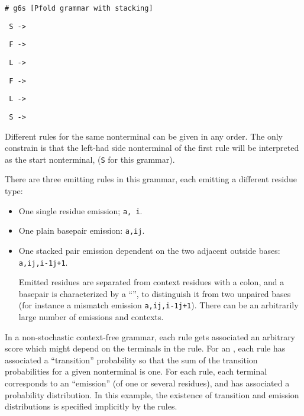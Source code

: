 \noindent
\begin{footnotesize}
\texttt{\# g6s  [Pfold grammar with stacking]}

\texttt{ S ->  }

\texttt{ F ->  }

\texttt{ L ->  }

\texttt{ F ->  }

\texttt{ L ->  }

\texttt{ S ->  }\\
\end{footnotesize}

\noindent
Different rules for the same nonterminal can be given in any order.
The only constrain is that the left-had side nonterminal of the
first rule will be interpreted as the start nonterminal, (\texttt{S}
for this grammar).

\noindent
There are three emitting rules in this grammar, each emitting a
different residue type: 
\begin{itemize}

\item One single residue emission; \texttt{a\sep
  i}. 

\item One plain basepair emission: \texttt{a\sep i\amphersand j}.

\item One stacked pair emission dependent on the two adjacent outside
bases:\\\texttt{a\sep i\amphersand j\sep i-1\com j+1}.

 Emitted residues are separated from context residues with a colon,
 and a basepair is characterized by a ``\amphersand'', to distinguish
 it from two unpaired bases (for instance a mismatch emission
 \texttt{a\sep i\com j\sep i-1\com j+1}). There can be an arbitrarily
 large number of emissions and contexts.

\end{itemize}

\noindent
In a non-stochastic context-free grammar, each rule gets associated an
arbitrary score which might depend on the terminals in the rule. For
an \scfg, each rule has associated a ``transition'' probability so
that the sum of the transition probabilities for a given nonterminal
is one. For each rule, each terminal corresponds to an ``emission''
(of one or several residues), and has associated a probability
distribution. In this example, the existence of transition and
emission distributions is specified implicitly by the rules.

